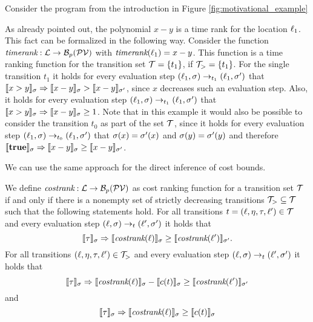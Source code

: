 \begin{example}
  Consider the program from the introduction in Figure \ref{fig:motivational_example}
  
  As already pointed out, the polynomial $x-y$ is a time rank for the location $\ell_1$.
  This fact can be formalized in the following way.
  Consider the function $\emph{timerank}: \mathcal{L} \rightarrow \mathcal{B}_p(\mathcal{PV})$ with $\emph{timerank}(\ell_1) = x-y$.
  This function is a time ranking function for the transition set $\mathcal{T} = \lbrace t_1 \rbrace$, if $\mathcal{T}_> = \lbrace t_1 \rbrace$.
  For the single transition $t_1$ it holds for every evaluation step $(\ell_1,\sigma) \rightarrow_{t_1} (\ell_1,\sigma')$ that $\llbracket x>y \rrbracket_{\sigma} \Rightarrow \llbracket x-y \rrbracket_{\sigma} > \llbracket x-y \rrbracket_{\sigma'}$, since $x$ decreases such an evaluation step.
  Also, it holds for every evaluation step $(\ell_1,\sigma) \rightarrow_{t_1} (\ell_1,\sigma')$ that $\llbracket x>y \rrbracket_{\sigma} \Rightarrow \llbracket x-y \rrbracket_{\sigma} \geq 1$.
  Note that in this example it would also be possible to consider the transition $t_0$ as part of the set $\mathcal{T}$, since it holds for every evaluation step $(\ell_1,\sigma) \rightarrow_{t_0} (\ell_1,\sigma')$ that $\sigma(x)=\sigma'(x)$ and $\sigma(y)=\sigma'(y)$ and therefore $\llbracket \textbf{true} \rrbracket_{\sigma} \Rightarrow \llbracket x-y \rrbracket_{\sigma} \geq \llbracket x-y \rrbracket_{\sigma'}$.
\end{example}

We can use the same approach for the direct inference of cost bounds.

\begin{definition} 
  We define $\emph{costrank}: \mathcal{L} \rightarrow \mathcal{B}_p(\mathcal{PV})$ as cost ranking function for a transition set $\mathcal{T}$ if and only if there is a nonempty set of strictly decreasing transitions $\mathcal{T}_{>} \subseteq \mathcal{T}$ such that the following statements hold.
  For all transitions $t = (\ell, \eta, \tau, \ell') \in \mathcal{T}$ and every evaluation step $(\ell, \sigma) \rightarrow_t (\ell', \sigma')$ it holds that
  \[ \llbracket \tau \rrbracket_{\sigma} \Rightarrow \llbracket \emph{costrank}(\ell) \rrbracket_{\sigma} \geq \llbracket \emph{costrank}(\ell') \rrbracket_{\sigma'}. \]
  For all transitions $(\ell, \eta, \tau, \ell') \in \mathcal{T}_{>}$ and every evaluation step $(\ell, \sigma) \rightarrow_t (\ell', \sigma')$ it holds that        
  \[ \llbracket \tau \rrbracket_{\sigma} \Rightarrow \llbracket \emph{costrank}(\ell) \rrbracket_{\sigma} - \llbracket c(t) \rrbracket_{\sigma} \geq \llbracket \emph{costrank}(\ell') \rrbracket_{\sigma'} \]
  and
  \[ \llbracket \tau \rrbracket_{\sigma} \Rightarrow \llbracket \emph{costrank}(\ell) \rrbracket_{\sigma} \geq \llbracket c(t) \rrbracket_{\sigma} \]
\end{definition}

